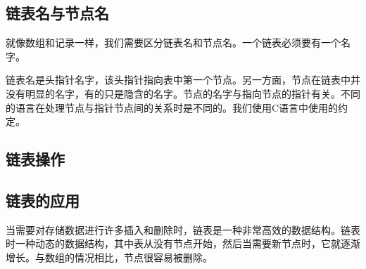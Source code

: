 \subsection{链表名与节点名}
就像数组和记录一样，我们需要区分链表名和节点名。一个链表必须要有一个名字。

链表名是头指针名字，该头指针指向表中第一个节点。另一方面，节点在链表中并没有明显的名字，有的只是隐含的名字。节点的名字与指向节点的指针有关。不同的语言在处理节点与指针节点间的关系时是不同的。我们使用C语言中使用的约定。
\subsection{链表操作}
\subsection{链表的应用}
当需要对存储数据进行许多插入和删除时，链表是一种非常高效的数据结构。链表时一种动态的数据结构，其中表从没有节点开始，然后当需要新节点时，它就逐渐增长。与数组的情况相比，节点很容易被删除。
